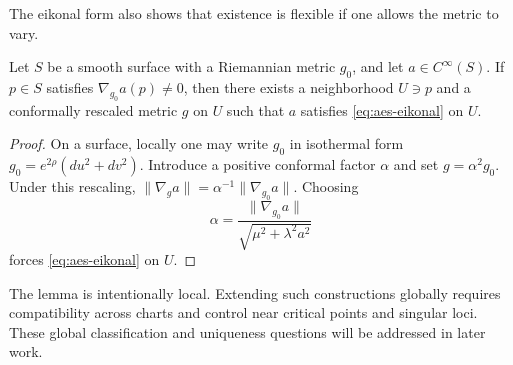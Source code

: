 The eikonal form also shows that existence is flexible if one allows the metric to vary.

\begin{lemma}\label{lemma:aes-local-rectification}
Let $S$ be a smooth surface with a Riemannian metric $g_0$, and let $a\in C^{\infty}(S)$. If $p\in S$ satisfies $\nabla_{g_0}a(p)\neq 0$, then there exists a neighborhood $U\ni p$ and a conformally rescaled metric $g$ on $U$ such that $a$ satisfies \eqref{eq:aes-eikonal} on $U$.
\end{lemma}

\begin{proof}
On a surface, locally one may write $g_0$ in isothermal form $g_0=e^{2\rho}(du^2+dv^2)$. Introduce a positive conformal factor $\alpha$ and set $g=\alpha^2 g_0$. Under this rescaling, $\|\nabla_g a\|=\alpha^{-1}\|\nabla_{g_0}a\|$. Choosing
\[
\alpha=\frac{\|\nabla_{g_0}a\|}{\sqrt{\mu^2+\lambda^2 a^2}}
\]
forces \eqref{eq:aes-eikonal} on $U$.
\end{proof}

The lemma is intentionally local. Extending such constructions globally requires compatibility across charts and control near critical points and singular loci. These global classification and uniqueness questions will be addressed in later work.
